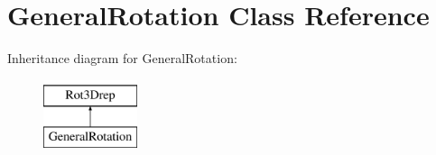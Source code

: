 \hypertarget{classGeneralRotation}{}\section{General\+Rotation Class Reference}
\label{classGeneralRotation}
Inheritance diagram for General\+Rotation\+:\begin{figure}[H]
\begin{center}
\leavevmode
\includegraphics[height=2.000000cm]{classGeneralRotation}
\end{center}
\end{figure}
